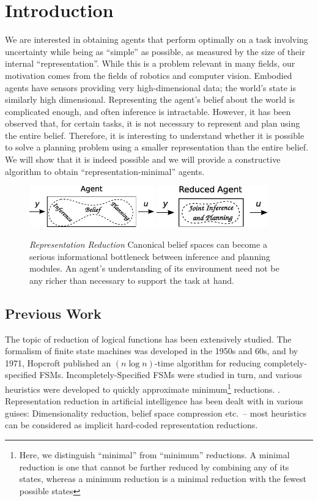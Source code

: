 \def\figh{2in}
\def\bfigh{2in}

\section{Introduction}
We are interested in obtaining agents that perform optimally on a task involving
uncertainty while being as “simple” as possible, as measured by the size of their
internal “representation”. While this is a problem relevant in many fields, our
motivation comes from the fields of robotics and computer vision. Embodied
agents have sensors providing very high-dimensional data; the world’s state is
similarly high dimensional. Representing the agent’s belief about the world is
complicated enough, and often inference is intractable. However, it has been
observed that, for certain tasks, it is not necessary to represent and plan using the
entire belief.
Therefore, it is interesting to understand whether it is possible to solve a
planning problem using a smaller representation than the entire belief. We will
show that it is indeed possible and we will provide a constructive algorithm to
obtain “representation-minimal” agents.
\begin{figure}
\includegraphics[height=0.7in]{agent}\qquad
\includegraphics[height=0.7in]{reduced_agent}
\caption{\emph{Representation Reduction} Canonical belief spaces can become a serious informational bottleneck
between inference and planning modules.  
An agent's understanding of its environment need not be any richer than necessary
to support the task at hand.}
\end{figure}
\subsection{Previous Work}
The topic of reduction of logical functions has been extensively studied.
The formalism of finite state machines was developed in the 1950s and 60s,
and by 1971, Hopcroft \cite{hopcroft1971n} published an $(n\log n)$-time algorithm for 
reducing completely-specified FSMs. 
Incompletely-Specified FSMs were studied in turn, and various heuristics were 
developed to quickly approximate minimum\footnote{Here, we distinguish ``minimal'' from ``minimum'' reductions.  
A minimal reduction is one that cannot be further reduced by combining any of its states, whereas
a minimum reduction is a minimal reduction with the fewest possible states} 
 reductions. \cite{Pfleeger:1973:SRI:1311965.1312829,grasselli1965method,goren2007state}.
 Representation reduction in artificial intelligence has been dealt with in various guises:
 Dimensionality reduction, belief space compression etc.\ -- most heuristics can be considered as
 implicit hard-coded representation reductions.
